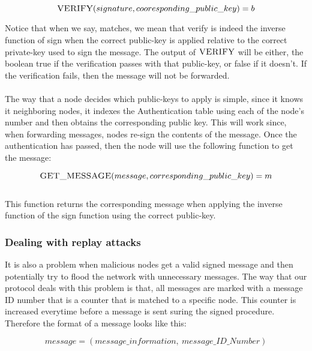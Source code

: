\documentclass[letterpaper]{article}
\begin{document}
$$\textsc{VERIFY}(signature, cooresponding\_public\_key) =  b $$

Notice that when we say, matches, we mean that verify is indeed the inverse function of sign when the correct public-key is applied relative to the correct private-key used to sign the message.
The output of $\textsc{VERIFY}$ will be either, the boolean true if the verification passes with that public-key, or false if it doesn't. If the verification fails, then the message will not be forwarded. 
\\
\\
The way that a node decides which public-keys to apply is simple, since it knows it neighboring nodes, it indexes the Authentication table using each of the node's number and then obtains the corresponding public key.
This will work since, when forwarding messages, nodes re-sign the contents of the message.
Once the authentication has passed, then the node will use the following function to get the message:

$$\textsc{GET\_MESSAGE}(message, corresponding\_public\_key) = m$$
\\

This function returns the corresponding message when applying the inverse function of the sign function using the correct public-key.

\subsubsection{Dealing with replay attacks}

It is also a problem when malicious nodes get a valid signed message and then potentially try to flood the network with unnecessary messages. The way that our protocol deals with this problem is that, all messages are marked with a message ID number that is a counter that is matched to a specific node. This counter is increased everytime before a message is sent suring the signed procedure. Therefore the format of a message looks like this:

$$message = (message\_information, \ message\_ID\_Number)$$
\end{document}
